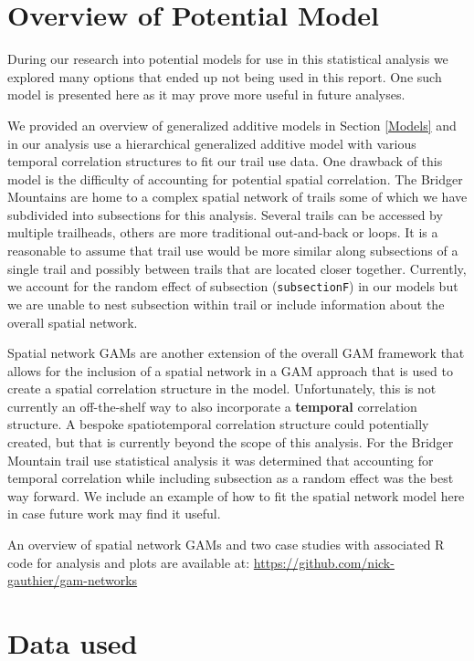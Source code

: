 \documentclass[
]{book}
\begin{document}
\hypertarget{overview-of-potential-model}{%
\section{Overview of Potential Model}\label{overview-of-potential-model}}

During our research into potential models for use in this statistical analysis we explored many options that ended up not being used in this report. One such model is presented here as it may prove more useful in future analyses.

We provided an overview of generalized additive models in Section \ref{Models} and in our analysis use a hierarchical generalized additive model with various temporal correlation structures to fit our trail use data. One drawback of this model is the difficulty of accounting for potential spatial correlation. The Bridger Mountains are home to a complex spatial network of trails some of which we have subdivided into subsections for this analysis. Several trails can be accessed by multiple trailheads, others are more traditional out-and-back or loops. It is a reasonable to assume that trail use would be more similar along subsections of a single trail and possibly between trails that are located closer together. Currently, we account for the random effect of subsection (\texttt{subsectionF}) in our models but we are unable to nest subsection within trail or include information about the overall spatial network.

Spatial network GAMs are another extension of the overall GAM framework that allows for the inclusion of a spatial network in a GAM approach that is used to create a spatial correlation structure in the model. Unfortunately, this is not currently an off-the-shelf way to also incorporate a \textbf{temporal} correlation structure. A bespoke spatiotemporal correlation structure could potentially created, but that is currently beyond the scope of this analysis. For the Bridger Mountain trail use statistical analysis it was determined that accounting for temporal correlation while including subsection as a random effect was the best way forward. We include an example of how to fit the spatial network model here in case future work may find it useful.

An overview of spatial network GAMs and two case studies with associated R code for analysis and plots are available at: \url{https://github.com/nick-gauthier/gam-networks}

\hypertarget{data-used-2}{%
\section{Data used}\label{data-used-2}}
\end{document}
